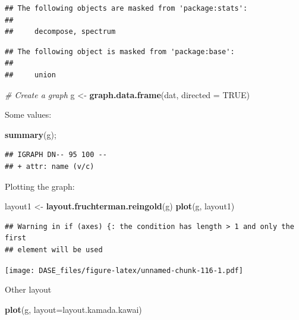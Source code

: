 \documentclass[]{book}
\newenvironment{Shaded}{\begin{snugshade}}{\end{snugshade}}
\newcommand{\KeywordTok}[1]{\textcolor[rgb]{0.13,0.29,0.53}{\textbf{{#1}}}}
\newcommand{\DataTypeTok}[1]{\textcolor[rgb]{0.13,0.29,0.53}{{#1}}}
\newcommand{\StringTok}[1]{\textcolor[rgb]{0.31,0.60,0.02}{{#1}}}
\newcommand{\CommentTok}[1]{\textcolor[rgb]{0.56,0.35,0.01}{\textit{{#1}}}}
\newcommand{\OtherTok}[1]{\textcolor[rgb]{0.56,0.35,0.01}{{#1}}}
\newcommand{\NormalTok}[1]{{#1}}
\begin{document}
\begin{verbatim}
## The following objects are masked from 'package:stats':
## 
##     decompose, spectrum
\end{verbatim}

\begin{verbatim}
## The following object is masked from 'package:base':
## 
##     union
\end{verbatim}

\begin{Shaded}
\begin{Highlighting}[]
\CommentTok{# Create a graph}
\NormalTok{g <-}\StringTok{ }\KeywordTok{graph.data.frame}\NormalTok{(dat, }\DataTypeTok{directed =} \OtherTok{TRUE}\NormalTok{)}
\end{Highlighting}
\end{Shaded}

Some values:

\begin{Shaded}
\begin{Highlighting}[]
\KeywordTok{summary}\NormalTok{(g); }
\end{Highlighting}
\end{Shaded}

\begin{verbatim}
## IGRAPH DN-- 95 100 -- 
## + attr: name (v/c)
\end{verbatim}

Plotting the graph:

\begin{Shaded}
\begin{Highlighting}[]
\NormalTok{layout1 <-}\StringTok{  }\KeywordTok{layout.fruchterman.reingold}\NormalTok{(g)}
\KeywordTok{plot}\NormalTok{(g, layout1)}
\end{Highlighting}
\end{Shaded}

\begin{verbatim}
## Warning in if (axes) {: the condition has length > 1 and only the first
## element will be used
\end{verbatim}

\texttt{[image: DASE\_files/figure-latex/unnamed-chunk-116-1.pdf]}

Other layout

\begin{Shaded}
\begin{Highlighting}[]
\KeywordTok{plot}\NormalTok{(g, }\DataTypeTok{layout=}\NormalTok{layout.kamada.kawai)}
\end{Highlighting}
\end{Shaded}
\end{document}
